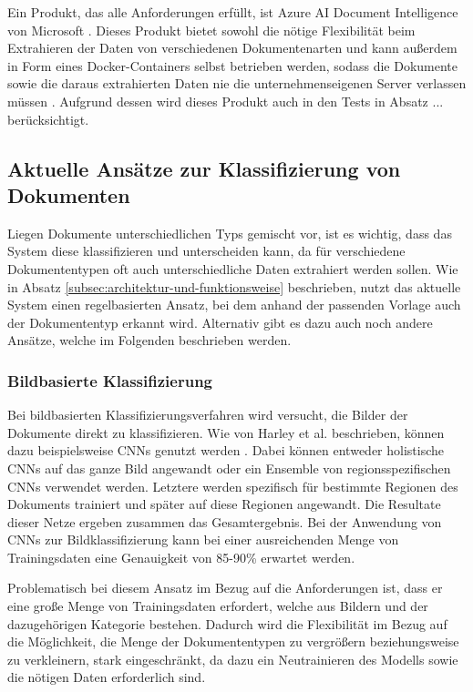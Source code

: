 Ein Produkt, das alle Anforderungen erfüllt, ist Azure AI Document Intelligence von Microsoft \cite{microsoft_azureai_documentintelligence}. Dieses Produkt bietet sowohl die nötige Flexibilität beim Extrahieren der Daten von verschiedenen Dokumentenarten und kann außerdem in Form eines Docker-Containers selbst betrieben werden, sodass die Dokumente sowie die daraus extrahierten Daten nie die unternehmenseigenen Server verlassen müssen \cite{microsoft_azureai_documentintelligence_containers}. Aufgrund dessen wird dieses Produkt auch in den Tests in Absatz ... berücksichtigt.

\subsection{Aktuelle Ansätze zur Klassifizierung von Dokumenten}
\label{subsec:aktuelle-ansätze-zur-klassifizierung-von-dokumenten}

Liegen Dokumente unterschiedlichen Typs gemischt vor, ist es wichtig, dass das System diese klassifizieren und unterscheiden kann, da für verschiedene Dokumententypen oft auch unterschiedliche Daten extrahiert werden sollen. Wie in Absatz \ref{subsec:architektur-und-funktionsweise} beschrieben, nutzt das aktuelle System einen regelbasierten Ansatz, bei dem anhand der passenden Vorlage auch der Dokumententyp erkannt wird. Alternativ gibt es dazu auch noch andere Ansätze, welche im Folgenden beschrieben werden.

\subsubsection{Bildbasierte Klassifizierung}
\label{subsubsec:bild-basierte-klassifizieurng}

Bei bildbasierten Klassifizierungsverfahren wird versucht, die Bilder der Dokumente direkt zu klassifizieren. Wie von Harley et al. beschrieben, können dazu beispielsweise CNNs genutzt werden \cite{HarleyAdamW2015EoDC}. Dabei können entweder holistische CNNs auf das ganze Bild angewandt oder ein Ensemble von regionsspezifischen CNNs verwendet werden. Letztere werden spezifisch für bestimmte Regionen des Dokuments trainiert und später auf diese Regionen angewandt. Die Resultate dieser Netze ergeben zusammen das Gesamtergebnis. Bei der Anwendung von CNNs zur Bildklassifizierung kann bei einer ausreichenden Menge von Trainingsdaten eine Genauigkeit von 85-90\% erwartet werden.

Problematisch bei diesem Ansatz im Bezug auf die Anforderungen ist, dass er eine große Menge von Trainingsdaten erfordert, welche aus Bildern und der dazugehörigen Kategorie bestehen. Dadurch wird die Flexibilität im Bezug auf die Möglichkeit, die Menge der Dokumententypen zu vergrößern beziehungsweise zu verkleinern, stark eingeschränkt, da dazu ein Neutrainieren des Modells sowie die nötigen Daten erforderlich sind.

